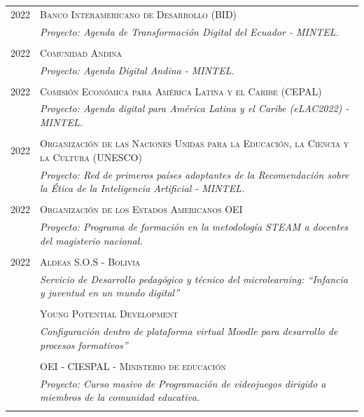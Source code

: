 \documentclass[a4paper]{article}
\begin{document}
\begin{longtable}{r|p{12cm}}
\textsc{2022} &  \textsc{Banco Interamericano de Desarrollo (BID)} \\&\emph{Proyecto: Agenda de Transformación Digital del Ecuador - MINTEL.}\\\multicolumn{2}{c}{}\\

\textsc{2022} &  \textsc{Comunidad Andina} \\&\emph{Proyecto: Agenda Digital Andina - MINTEL.}\\\multicolumn{2}{c}{}\\

\textsc{2022} &  \textsc{Comisión Económica para América Latina y el Caribe (CEPAL)} \\&\emph{Proyecto: Agenda digital para América Latina y el Caribe (eLAC2022) - MINTEL.}\\\multicolumn{2}{c}{}\\


\textsc{2022} &  \textsc{Organización de las Naciones Unidas para la Educación, la Ciencia y la Cultura (UNESCO)} \\&\emph{Proyecto: Red de primeros países adoptantes de la Recomendación sobre la Ética de la Inteligencia Artificial - MINTEL.}\\\multicolumn{2}{c}{}\\

\textsc{2022} &  \textsc{Organización de los Estados Americanos OEI} \\&\emph{Proyecto: Programa de formación en la metodología STEAM a docentes del magisterio nacional.}\\\multicolumn{2}{c}{} \\

\textsc{2022} &  \textsc{Aldeas S.O.S - Bolivia} \\&\emph{Servicio de Desarrollo pedagógico y técnico del microlearning:
“Infancia y juventud en un mundo digital”}\\\multicolumn{2}{c}{} \\

\textsc{2021} &  \textsc{OEI - CIESPAL - Ministerio de educación} \\&\emph{Proyecto: Curso masivo de Programación de videojuegos dirigido a miembros de la comunidad educativa.}\\\multicolumn{2}{c}{} \\


\end{longtable}
\end{document}
